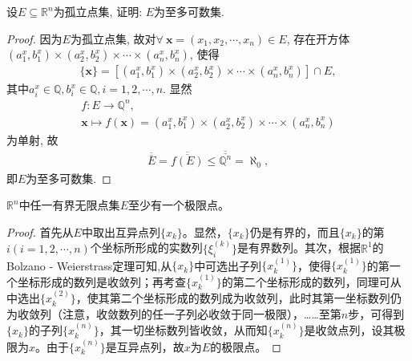 \documentclass[../../main.tex]{subfiles}%
\begin{document}
\begin{proposition}
设$E \subseteq \mathbb{R}^n$为孤立点集, 证明: $E$为至多可数集.
\end{proposition}
\begin{proof}

因为$E$为孤立点集, 故对$\forall\ \boldsymbol{x}=(x_1,x_2,\cdots,x_n) \in E$, 存在开方体$(a_1^x,b_1^x) \times (a_2^x,b_2^x) \times \cdots \times (a_n^x,b_n^x)$, 使得
\begin{align*}
\{\boldsymbol{x}\} = \left[ (a_1^x,b_1^x) \times (a_2^x,b_2^x) \times \cdots \times (a_n^x,b_n^x) \right] \cap E,
\end{align*}
其中$a_i^x \in \mathbb{Q}, b_i^x \in \mathbb{Q}, i=1,2,\cdots,n.$ 显然
\begin{gather*}
f: E \to \mathbb{Q}^n, \\
\boldsymbol{x} \mapsto f(\boldsymbol{x}) = (a_1^x,b_1^x) \times (a_2^x,b_2^x) \times \cdots \times (a_n^x,b_n^x)
\end{gather*}
为单射, 故
\begin{align*}
\overline{\overline{E}} = \overline{\overline{f(E)}} \leqslant \overline{\overline{\mathbb{Q}^n}} = \aleph_0,
\end{align*}
即$E$为至多可数集.

\end{proof}

\begin{theorem}\label{theorem:R^n中的Bolzano - Weierstrass定理}
\(\mathbb{R}^n\)中任一有界无限点集\(E\)至少有一个极限点。
\end{theorem}
\begin{proof}

首先从\(E\)中取出互异点列\(\{x_k\}\)。显然，\(\{x_k\}\)仍是有界的，而且\(\{x_k\}\)的第\(i(i = 1,2,\cdots,n)\)个坐标所形成的实数列\(\{\xi_i^{(k)}\}\)是有界数列。其次，根据\(\mathbb{R}^1\)的Bolzano - Weierstrass定理可知,从\(\{x_k\}\)中可选出子列\(\{x_k^{(1)}\}\)，使得\(\{x_k^{(1)}\}\)的第一个坐标形成的数列是收敛列；再考查\(\{x_k^{(1)}\}\)的第二个坐标形成的数列，同理可从中选出\(\{x_k^{(2)}\}\)，使其第二个坐标形成的数列成为收敛列，此时其第一坐标数列仍为收敛列（注意，收敛数列的任一子列必收敛于同一极限），……至第\(n\)步，可得到\(\{x_k\}\)的子列\(\{x_k^{(n)}\}\)，其一切坐标数列皆收敛，从而知\(\{x_k^{(n)}\}\)是收敛点列，设其极限为\(x\)。由于\(\{x_k^{(n)}\}\)是互异点列，故\(x\)为\(E\)的极限点。

\end{proof}
\end{document}
